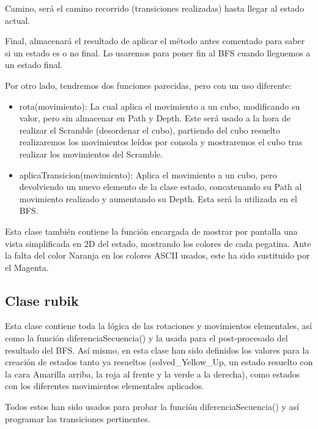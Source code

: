\documentclass[11pt]{article}
\begin{document}
Camino, será el camino recorrido (transiciones realizadas) hasta llegar al estado actual.
\newline

Final, almacenará el resultado de aplicar el método antes comentado para saber si un estado es o no final. Lo usaremos para poner fin al BFS cuando lleguemos a un estado final.
\newline

Por otro lado, tendremos dos funciones parecidas, pero con un uso diferente:
\begin{itemize}
	\item rota(movimiento): La cual aplica el movimiento a un cubo, modificando su valor, pero sin almacenar en Path y Depth. Este será usado a la hora de realizar el Scramble (desordenar el cubo), partiendo del cubo resuelto realizaremos los movimientos leídos por consola y mostraremos el cubo tras realizar los movimientos del Scramble.
	\item aplicaTransicion(movimiento): Aplica el movimiento a un cubo, pero devolviendo un nuevo elemento de la clase estado, concatenando su Path al movimiento realizado y aumentando su Depth. Esta será la utilizada en el BFS.
\end{itemize}

Esta clase también contiene la función encargada de mostrar por pantalla una vista simplificada en 2D del estado, mostrando los colores de cada pegatina. Ante la falta del color Naranja en los colores ASCII usados, este ha sido sustituido por el Magenta.

\subsection{Clase rubik}

Esta clase contiene toda la lógica de las rotaciones y movimientos elementales, así como la función diferenciaSecuencia() y la usada para el post-procesado del resultado del BFS. Así mismo, en esta clase han sido definidos los valores para la creación de estados tanto ya resueltos (solved\_Yellow\_Up, un estado resuelto con la cara Amarilla arriba, la roja al frente y la verde a la derecha), como estados con los diferentes movimientos elementales aplicados.
\newline

Todos estos han sido usados para probar la función diferenciaSecuencia() y así programar las transiciones pertinentes. 
\newline
\end{document}
